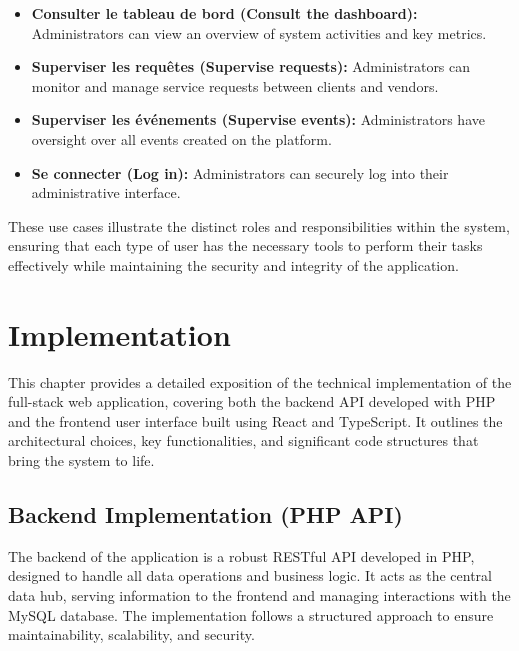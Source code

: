 \documentclass{report}
\begin{document}
\begin{itemize}
\begin{itemize}
        \item \textbf{Consulter le tableau de bord (Consult the dashboard):} Administrators can view an overview of system activities and key metrics.
        \item \textbf{Superviser les requêtes (Supervise requests):} Administrators can monitor and manage service requests between clients and vendors.
        \item \textbf{Superviser les événements (Supervise events):} Administrators have oversight over all events created on the platform.
        \item \textbf{Se connecter (Log in):} Administrators can securely log into their administrative interface.
    \end{itemize}
\end{itemize}
These use cases illustrate the distinct roles and responsibilities within the system, ensuring that each type of user has the necessary tools to perform their tasks effectively while maintaining the security and integrity of the application.

\chapter{Implementation}
\label{chap:implementation}
This chapter provides a detailed exposition of the technical implementation of the full-stack web application, covering both the backend API developed with PHP and the frontend user interface built using React and TypeScript. It outlines the architectural choices, key functionalities, and significant code structures that bring the system to life.

\section{Backend Implementation (PHP API)}
\label{sec:backend_implementation}
The backend of the application is a robust RESTful API developed in PHP, designed to handle all data operations and business logic. It acts as the central data hub, serving information to the frontend and managing interactions with the MySQL database. The implementation follows a structured approach to ensure maintainability, scalability, and security.
\end{document}
